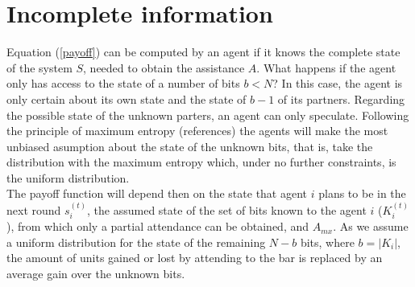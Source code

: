 \documentclass[12pt]{article}
\begin{document}
\section{Incomplete information}
Equation (\ref{payoff}) can be computed by an agent if it knows the complete state of the system $S$, needed to obtain the assistance $A$. What happens if the agent only has access to the state of a number of bits $b<N$? In this case, the agent is only certain about its own state and the state of $b-1$ of its partners. Regarding the possible state of the unknown parters, an agent can only speculate. Following the principle of maximum entropy (references) the agents will make the most unbiased asumption about the state of the unknown bits, that is, take the distribution with the maximum entropy which, under no further constraints, is the uniform distribution.\\

The payoff function will depend then on the state that agent $i$ plans to be in the next round $s_i^{(t)}$, the assumed state of the set of bits known to the agent $i$ ($K_i^{(t)}$), from which only a partial attendance can be obtained, and $A_{mx}$. As we assume a uniform distribution for the state of the remaining $N-b$ bits, where $b=|K_i|$, the amount of units gained or lost by attending to the bar is replaced by an average gain over the unknown bits.\\
\end{document}
